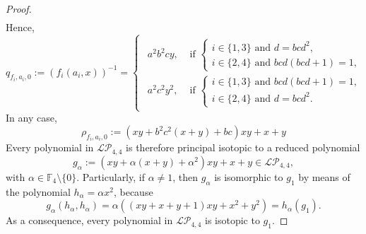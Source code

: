 \documentclass[10pt,a4paper]{amsart}
\begin{document}
\begin{proof}
\begin{align*}
\end{align*}
Hence,
\[q_{f_i,a_i,0}:=\left(f_i(a_i,x)\right)^{-1}= \begin{cases}\begin{array}{ll}
    a^2b^2cy, & \text{ if } \begin{cases}i\in\{1,3\} \text{ and } d=bcd^2,\\
    i\in\{2,4\} \text{ and } bcd(bcd+1)=1,
    \end{cases}\\
    a^2c^2y^2, & \text{ if } \begin{cases}
     i\in\{1,3\} \text{ and } bcd(bcd+1)=1,\\
     i\in\{2,4\} \text{ and } d=bcd^2.
    \end{cases}
    \end{array}
    \end{cases}\]
In any case, 
\[\rho_{f_i,a_i,0}:=(xy+b^2c^2(x+y)+bc)xy+x+y\]
Every polynomial in $\mathcal{LP}_{4,4}$ is therefore principal isotopic to a reduced polynomial
\[g_\alpha:=(xy+\alpha(x+y)+\alpha^2)xy+x+y\in\mathcal{LP}_{4,4},\]
with $\alpha\in\mathbb{F}_4\setminus\{0\}$. Particularly, if $\alpha\neq 1$, then $g_\alpha$ is isomorphic to $g_1$ by means of the polynomial $h_\alpha=\alpha x^2$, because
\[g_\alpha(h_\alpha,h_\alpha)=\alpha\left((xy+x+y+1)xy+x^2+y^2\right)=h_\alpha(g_1).\]
As a consequence, every polynomial in $\mathcal{LP}_{4,4}$ is isotopic to $g_1$.
\end{proof}
\end{document}

